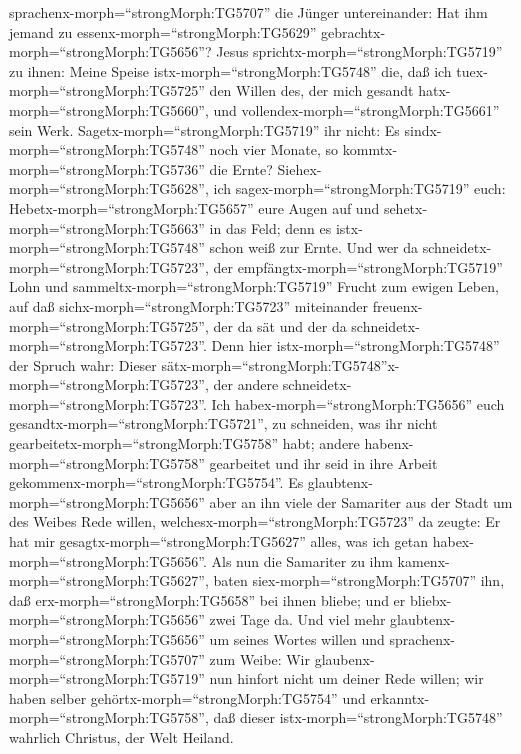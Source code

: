 sprachenx-morph=``strongMorph:TG5707'' die Jünger untereinander: Hat ihm
jemand zu essenx-morph=``strongMorph:TG5629''
gebrachtx-morph=``strongMorph:TG5656''?  Jesus
sprichtx-morph=``strongMorph:TG5719'' zu ihnen: Meine Speise
istx-morph=``strongMorph:TG5748'' die, daß ich
tuex-morph=``strongMorph:TG5725'' den Willen des, der mich gesandt
hatx-morph=``strongMorph:TG5660'', und
vollendex-morph=``strongMorph:TG5661'' sein Werk. 
Sagetx-morph=``strongMorph:TG5719'' ihr nicht: Es
sindx-morph=``strongMorph:TG5748'' noch vier Monate, so
kommtx-morph=``strongMorph:TG5736'' die Ernte?
Siehex-morph=``strongMorph:TG5628'', ich
sagex-morph=``strongMorph:TG5719'' euch:
Hebetx-morph=``strongMorph:TG5657'' eure Augen auf und
sehetx-morph=``strongMorph:TG5663'' in das Feld; denn es
istx-morph=``strongMorph:TG5748'' schon weiß zur Ernte. 
Und wer da schneidetx-morph=``strongMorph:TG5723'', der
empfängtx-morph=``strongMorph:TG5719'' Lohn und
sammeltx-morph=``strongMorph:TG5719'' Frucht zum ewigen Leben, auf daß
sichx-morph=``strongMorph:TG5723'' miteinander
freuenx-morph=``strongMorph:TG5725'', der da sät und der da
schneidetx-morph=``strongMorph:TG5723''.  Denn hier
istx-morph=``strongMorph:TG5748'' der Spruch wahr: Dieser
sätx-morph=``strongMorph:TG5748''x-morph=``strongMorph:TG5723'', der
andere schneidetx-morph=``strongMorph:TG5723''.  Ich
habex-morph=``strongMorph:TG5656'' euch
gesandtx-morph=``strongMorph:TG5721'', zu schneiden, was ihr nicht
gearbeitetx-morph=``strongMorph:TG5758'' habt; andere
habenx-morph=``strongMorph:TG5758'' gearbeitet und ihr seid in ihre
Arbeit gekommenx-morph=``strongMorph:TG5754''.  Es
glaubtenx-morph=``strongMorph:TG5656'' aber an ihn viele der Samariter
aus der Stadt um des Weibes Rede willen,
welchesx-morph=``strongMorph:TG5723'' da zeugte: Er hat mir
gesagtx-morph=``strongMorph:TG5627'' alles, was ich getan
habex-morph=``strongMorph:TG5656''.  Als nun die Samariter
zu ihm kamenx-morph=``strongMorph:TG5627'', baten
siex-morph=``strongMorph:TG5707'' ihn, daß
erx-morph=``strongMorph:TG5658'' bei ihnen bliebe; und er
bliebx-morph=``strongMorph:TG5656'' zwei Tage da.  Und viel
mehr glaubtenx-morph=``strongMorph:TG5656'' um seines Wortes willen
 und sprachenx-morph=``strongMorph:TG5707'' zum Weibe: Wir
glaubenx-morph=``strongMorph:TG5719'' nun hinfort nicht um deiner Rede
willen; wir haben selber gehörtx-morph=``strongMorph:TG5754'' und
erkanntx-morph=``strongMorph:TG5758'', daß dieser
istx-morph=``strongMorph:TG5748'' wahrlich Christus, der Welt Heiland.
